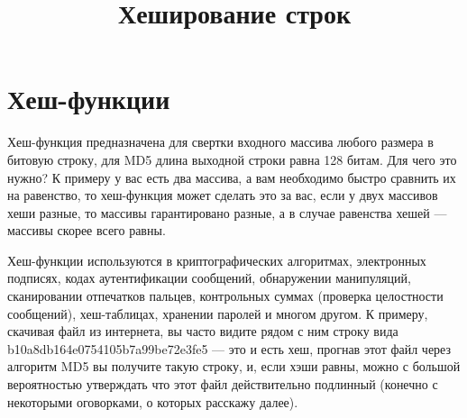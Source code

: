 \documentclass[a4paper, 12pt, oneside]{scrartcl}
\title{Хеширование строк}
\author{}
\date{}
\begin{document}
    \maketitle
    \section{Хеш-функции}\label{sec:section1}
   Хеш-функция предназначена для свертки входного массива любого размера в битовую строку, для MD5 длина выходной строки равна 128 битам. Для чего это нужно?
   К примеру у вас есть два массива, а вам необходимо быстро сравнить их на равенство, то хеш-функция может сделать это за вас, если у двух массивов хеши разные, то массивы гарантировано разные, а в случае равенства хешей — массивы скорее всего равны.
   
   Хеш-функции используются в криптографических алгоритмах, электронных подписях, кодах аутентификации сообщений, обнаружении манипуляций, сканировании отпечатков пальцев, контрольных суммах (проверка целостности сообщений), хеш-таблицах, хранении паролей и многом другом. К примеру, скачивая файл из интернета, вы часто видите рядом с ним строку вида b10a8db164e0754105b7a99be72e3fe5 — это и есть хеш, прогнав этот файл через алгоритм MD5 вы получите такую строку, и, если хэши равны, можно с большой вероятностью утверждать что этот файл действительно подлинный (конечно с некоторыми оговорками, о которых расскажу далее).~\cite{managementsystem}
\end{document}
